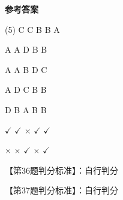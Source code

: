 \documentclass[11pt, a4paper]{article}
\begin{document}
\begin{center}
    \Huge \textbf{参考答案}
\end{center}

    \begin{tasks}[label=\arabic*. , label-width=14pt](5)
        \task C
        \task C
        \task B
        \task B
        \task A

        \task A
        \task A
        \task D
        \task B
        \task B

        \task A
        \task A
        \task B
        \task D
        \task C

        \task A
        \task D
        \task C
        \task B
        \task B

        \task D
        \task B
        \task A
        \task B
        \task B

        \task $\checkmark$
        \task $\checkmark$
        \task $\times$
        \task $\checkmark$
        \task $\checkmark$

        \task $\times$
        \task $\times$
        \task $\checkmark$
        \task $\times$
        \task $\checkmark$
    \end{tasks}

    【第36题判分标准】：自行判分

    【第37题判分标准】：自行判分
\end{document}
